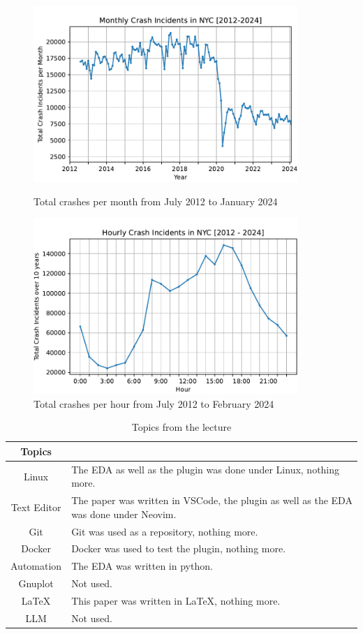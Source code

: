 \documentclass[runningheads]{llncs}
\begin{document}
\begin{figure}
\center
\includegraphics[width=10cm]{crashes_over_year.pdf}
\caption{Total crashes per month from July 2012 to January 2024}

\includegraphics[width=10cm]{crash_by_time.pdf}
\caption{Total crashes per hour from July 2012 to February 2024}
\end{figure}

\begin{table}
    \centering
    \caption{Topics from the lecture}
    \begin{tabular}{c p{6cm}}
        Topics\\
        \hline
        Linux & The EDA as well as the plugin was done under Linux, nothing more. \\
        Text Editor & The paper was written in VSCode, the plugin as well as the EDA was done under Neovim. \\
        Git & Git was used as a repository, nothing more.\\
        Docker & Docker was used to test the plugin, nothing more.\\
        Automation & The EDA was written in python.\\
        Gnuplot & Not used.\\
        \LaTeX & This paper was written in \LaTeX, nothing more.\\
        LLM & Not used.\\
    \end{tabular}
\end{table}
\end{document}
